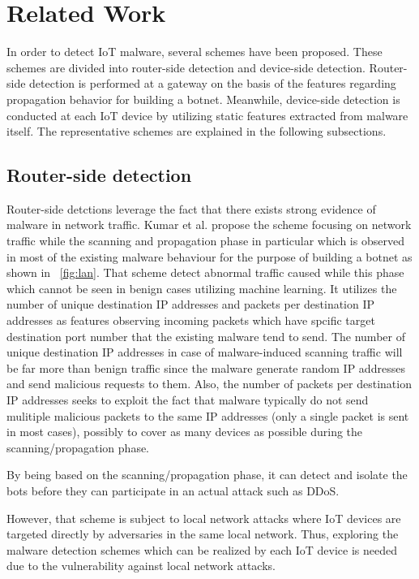 \chapter{Related Work}\label{sec:related_work} 
In order to detect IoT malware, several schemes have been proposed. 
These schemes are divided into router-side detection and device-side detection.
Router-side detection is performed at a gateway on the basis of the features regarding propagation behavior for building a botnet.
Meanwhile, device-side detection is conducted at each IoT device by utilizing static features extracted from malware itself.
The representative schemes are explained in the following subsections.

\section{Router-side detection}
Router-side detctions leverage the fact that there exists strong evidence of malware in network traffic.
Kumar et al. \cite{net} propose the scheme focusing on network traffic while the scanning and propagation phase in particular which is observed in most of the existing malware behaviour for the purpose of building a botnet as shown in \figurename~\ref{fig:lan}. 
That scheme detect abnormal traffic caused while this phase which cannot be seen in benign cases utilizing machine learning.
It utilizes the number of unique destination IP addresses and packets per destination IP addresses as features observing incoming packets which have spcific target destination port number that the existing malware tend to send.
The number of unique destination IP addresses in case of malware-induced scanning traffic will be far more than benign traffic since the malware generate random IP addresses and send malicious requests to them.
Also, the number of packets per destination IP addresses seeks to exploit the fact that malware typically do not send mulitiple malicious packets to the same IP addresses (only a single packet is sent in most cases), possibly to cover as many devices as possible during the scanning/propagation phase.

By being based on the scanning/propagation phase, it can detect and isolate the bots before they can participate in an actual attack such as DDoS.

However, that scheme is subject to local network attacks where IoT devices are targeted directly by adversaries in the same local network.
Thus, exploring the malware detection schemes which can be realized by each IoT device is needed due to the vulnerability against local network attacks.

